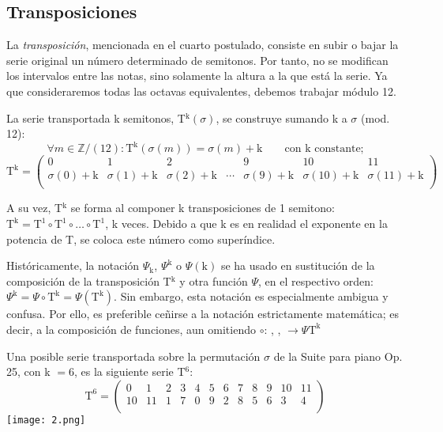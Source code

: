 	\subsection{Transposiciones}
		La \emph{transposición}, mencionada en el cuarto postulado, consiste en subir o bajar la serie original un número determinado de semitonos. Por tanto, no se modifican los intervalos entre las notas, sino solamente la altura a la que está la serie. Ya que consideraremos todas las octavas equivalentes, debemos trabajar módulo 12. 
		
		La serie transportada k semitonos, T$^\text{k}\left(\sigma\right)$, se construye sumando k a $\sigma$ (mod. 12):
		$$
		\forall m\in \mathbb{Z} / (12):	\text{T}^\text{k}\left(\sigma\left(m\right)\right)=\sigma\left(m\right)+\text{k} \qquad \text{con k constante;}
		$$		
		$$
		\text{T}^\text{k}=\left(\begin{matrix}0&1&2&&9&10&11\\\sigma\left(0\right)+\text{k}&\sigma\left(1\right)+\text{k}&\sigma\left(2\right)+\text{k}&\cdots&\sigma\left(9\right)+\text{k}&\sigma\left(10\right)+\text{k}&\sigma\left(11\right)+\text{k}\\\end{matrix}\right)
		$$
		
		A su vez, T$^\text{k}$ se forma al componer k transposiciones de 1 semitono: $\text{T}^\text{k}=\text{T}^1\circ\text{T}^1\circ\ldots\circ\text{T}^1$, k veces. Debido a que k es en realidad el exponente en la potencia de T, se coloca este número como superíndice.
		
		Históricamente, la notación $\Psi_\text{k}$, $\Psi^\text{k}$ o $\Psi(\text{k})$ se ha usado en sustitución de la composición de la transposición T$^\text{k}$ y otra función $\Psi$, en el respectivo orden: $\Psi^\text{k}=\Psi \circ \text{T}^\text{k} = \Psi(\text{T}^\text{k})$. Sin embargo, esta notación es especialmente ambigua y confusa. Por ello, es preferible ceñirse a la notación estrictamente matemática; es decir, a la composición de funciones, aun omitiendo $\circ$: , ,  $\rightarrow \Psi\text{T}^\text{k}$
		
		Una posible serie transportada sobre la permutación $\sigma$ de la Suite para piano Op. 25, con k $= 6$, es la siguiente serie T$^6$:
		$$\text{T}^6=\left(\begin{matrix}0&1&2&3&4&5&6&7&8&9&10&11\\10&11&1&7&0&9&2&8&5&6&3&4\\\end{matrix}\right)$$	
		\texttt{[image: 2.png]}
		
